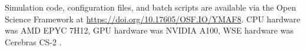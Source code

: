 


Simulation code, configuration files, and batch scripts are available via the Open Science Framework at \url{https://doi.org/10.17605/OSF.IO/YMAF8}.
CPU hardware was AMD EPYC 7H12, GPU hardware was NVIDIA A100, WSE hardware was Cerebras CS-2 \cite{buitrago2021neocortex,Brashear2025}.



